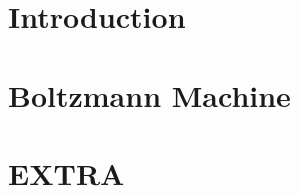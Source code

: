 \documentclass[a4paper,12pt,oneside,onecolumn,final,fleqn]{config/UERJ/repUERJ}
\begin{document}


\mainmatter


\chapter*{Introduction}
\label{ch:0}


\chapter{Boltzmann Machine}
\label{ch:1}


\chapter{EXTRA}
\label{ch:extra}


%

%


\end{document}
